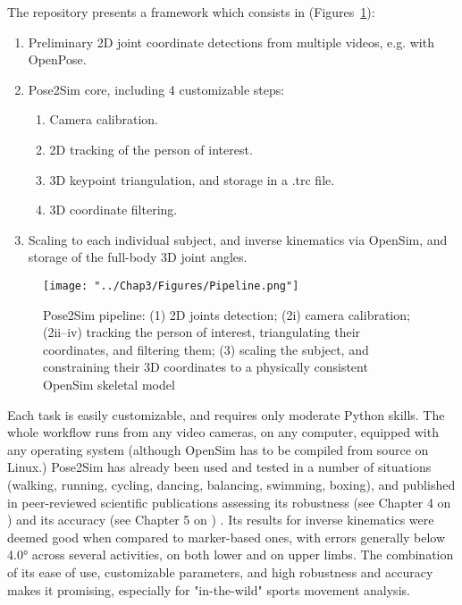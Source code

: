 The repository presents a framework which consists in (Figures~\ref{fig_pipeline}):
\begin{enumerate}[itemsep=-0.5em, topsep=0pt, leftmargin=*]
      \item Preliminary 2D joint coordinate detections from multiple videos, e.g. with OpenPose.
      \item Pose2Sim core, including 4 customizable steps:
      \begin{enumerate}[before=\vspace{-0.5\baselineskip}, nosep]
            \item Camera calibration.
            \item 2D tracking of the person of interest.
            \item 3D keypoint triangulation, and storage in a .trc file.
            \item 3D coordinate filtering.
      \end{enumerate}
      \item Scaling to each individual subject, and inverse kinematics via OpenSim, and storage of the full-body 3D joint angles.
\end{enumerate}

\begin{figure}[hbtp]
	\centering
	\def\svgwidth{1\columnwidth}
	\fontsize{10pt}{10pt}\selectfont
	\texttt{[image: "../Chap3/Figures/Pipeline.png"]}
	\caption{Pose2Sim pipeline: (1) 2D joints detection; (2i) camera calibration; (2ii–iv) tracking the person of interest, triangulating their coordinates, and filtering them; (3) scaling the subject, and constraining their 3D coordinates to a physically consistent OpenSim skeletal model}
	\label{fig_pipeline}
\end{figure}
\FloatBarrier

Each task is easily customizable, and requires only moderate Python skills. The whole workflow runs from any video cameras, on any computer, equipped with any operating system (although OpenSim has to be compiled from source on Linux.) Pose2Sim has already been used and tested in a number of situations (walking, running, cycling, dancing, balancing, swimming, boxing), and published in peer-reviewed scientific publications assessing its robustness (see Chapter 4 on ) \cite{Pagnon2021} and its accuracy (see Chapter 5 on ) \cite{Pagnon2022a}. Its results for inverse kinematics were deemed good when compared to marker-based ones, with errors generally below 4.0° across several activities, on both lower and on upper limbs. The combination of its ease of use, customizable parameters, and high robustness and accuracy makes it promising, especially for "in-the-wild" sports movement analysis.


